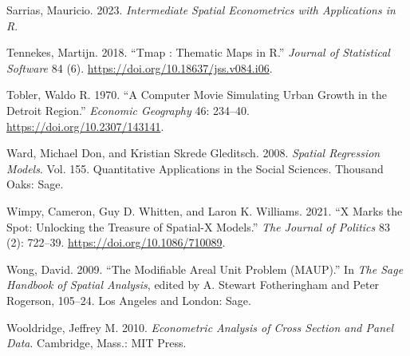 \documentclass[
  letterpaper,
]{scrbook}
\newlength{\cslhangindent}
\newlength{\cslentryspacingunit} %
\newenvironment{CSLReferences}[2] %
 {%
  \setlength{\parindent}{0pt}
  \ifodd #1
  \let\oldpar\par
  \def\par{\hangindent=\cslhangindent\oldpar}
  \fi
  \setlength{\parskip}{#2\cslentryspacingunit}
 }%
 {}
\begin{document}
\begin{CSLReferences}{1}{0}
\leavevmode{}%
Sarrias, Mauricio. 2023. \emph{Intermediate {Spatial Econometrics} with
{Applications} in {R}}.

\leavevmode{}%
Tennekes, Martijn. 2018. {``Tmap : {Thematic Maps} in {R}.''}
\emph{Journal of Statistical Software} 84 (6).
\url{https://doi.org/10.18637/jss.v084.i06}.

\leavevmode{}%
Tobler, Waldo R. 1970. {``A {Computer Movie Simulating Urban Growth} in
the {Detroit Region}.''} \emph{Economic Geography} 46: 234--40.
\url{https://doi.org/10.2307/143141}.

\leavevmode{}%
Ward, Michael Don, and Kristian Skrede Gleditsch. 2008. \emph{Spatial
{Regression Models}}. Vol. 155. Quantitative {Applications} in the
{Social Sciences}. {Thousand Oaks}: {Sage}.

\leavevmode{}%
Wimpy, Cameron, Guy D. Whitten, and Laron K. Williams. 2021. {``X
{Marks} the {Spot}: {Unlocking} the {Treasure} of {Spatial-X Models}.''}
\emph{The Journal of Politics} 83 (2): 722--39.
\url{https://doi.org/10.1086/710089}.

\leavevmode{}%
Wong, David. 2009. {``The {Modifiable Areal Unit Problem} ({MAUP}).''}
In \emph{The {Sage Handbook} of {Spatial Analysis}}, edited by A.
Stewart Fotheringham and Peter Rogerson, 105--24. {Los Angeles and
London}: {Sage}.

\leavevmode{}%
Wooldridge, Jeffrey M. 2010. \emph{Econometric {Analysis} of {Cross
Section} and {Panel Data}}. {Cambridge, Mass.}: {MIT Press}.

\end{CSLReferences}


\backmatter
\end{document}
